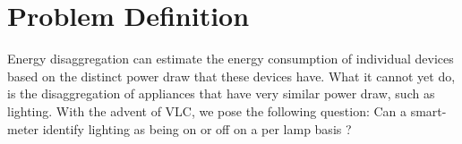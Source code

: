 

\section{Problem Definition}

Energy disaggregation can estimate the energy consumption of individual devices based on the distinct power draw that these devices have.
What it cannot yet do, is the disaggregation of appliances that have very similar power draw, such as lighting.
With the advent of VLC, we pose the following question: Can a smart-meter identify lighting as being on or off on a per lamp basis ?
